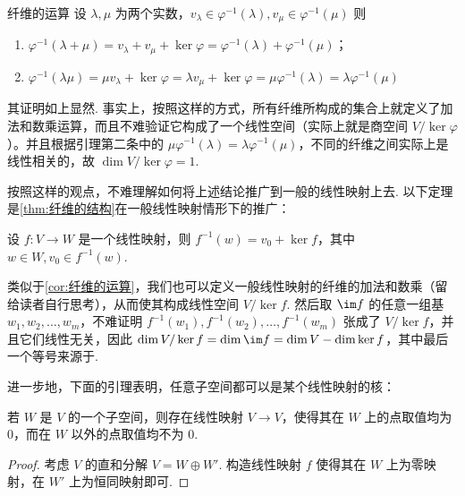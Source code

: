 \begin{corollary}{}{纤维的运算}
    设 $\lambda, \mu$ 为两个实数，$v_\lambda \in \varphi^{-1}(\lambda), v_\mu \in \varphi^{-1} (\mu)$ 则

    \begin{enumerate}
        \item $\varphi^{-1} (\lambda + \mu) = v_\lambda + v_\mu + \ker \varphi = \varphi^{-1} (\lambda) + \varphi^{-1} (\mu)$；
        \item $\varphi^{-1} (\lambda \mu) = \mu v_\lambda + \ker \varphi = \lambda v_\mu + \ker \varphi = \mu \varphi^{-1} (\lambda) = \lambda \varphi^{-1} (\mu)$
    \end{enumerate}
\end{corollary}

其证明如上显然. 事实上，按照这样的方式，所有纤维所构成的集合上就定义了加法和数乘运算，而且不难验证它构成了一个线性空间（实际上就是商空间 $V/\ker \varphi$）。并且根据引理第二条中的 $\mu \varphi^{-1} (\lambda) = \lambda \varphi^{-1} (\mu)$，不同的纤维之间实际上是线性相关的，故 $\dim V/\ker \varphi = 1$.

按照这样的观点，不难理解如何将上述结论推广到一般的线性映射上去. 以下定理是\autoref{thm:纤维的结构}在一般线性映射情形下的推广：

\begin{theorem}{}{}
    设 $f\colon V \to W$ 是一个线性映射，则 $f^{-1} (w) = v_0 + \ker f$，其中 $w \in W, v_0 \in f^{-1} (w)$.
\end{theorem}

类似于\autoref{cor:纤维的运算}，我们也可以定义一般线性映射的纤维的加法和数乘（留给读者自行思考），从而使其构成线性空间 $V/\ker f$. 然后取 $\im f$ 的任意一组基 $w_1, w_2,\ldots, w_m$，不难证明 $f^{-1} (w_1), f^{-1} (w_2),\ldots, f^{-1} (w_m)$ 张成了 $V/\ker f$，并且它们线性无关，因此 $\dim V/\ker f = \dim \im f = \dim V - \dim \ker f$，其中最后一个等号来源于.

进一步地，下面的引理表明，任意子空间都可以是某个线性映射的核：
\begin{lemma}{}{}
    若 $W$ 是 $V$ 的一个子空间，则存在线性映射 $V \to V$，使得其在 $W$ 上的点取值均为 $0$，而在 $W$ 以外的点取值均不为 $0$.
\end{lemma}

\begin{proof}
    考虑 $V$ 的直和分解 $V = W \oplus W'$. 构造线性映射 $f$ 使得其在 $W$ 上为零映射，在 $W'$ 上为恒同映射即可.
\end{proof}

